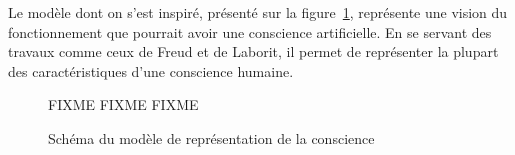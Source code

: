 Le modèle dont on s'est inspiré, présenté sur la figure~\ref{modele_original},
représente une vision du fonctionnement que pourrait avoir une conscience
artificielle. En se servant des travaux comme ceux de Freud et de Laborit, il permet de représenter la plupart des caractéristiques
d’une conscience humaine. 
\begin{figure}[H] 
\centering
FIXME FIXME FIXME
\caption{Schéma du modèle de représentation de la conscience} 
\label{modele_original}
\end{figure}